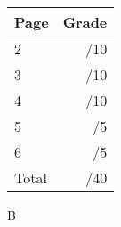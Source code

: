 \documentclass[12pt]{article}
\newcommand{\skipline}{\vspace{12pt}}
\begin{document}
\begin{table}[hbt]
\begin{center}
\begin{tabular}{|l|r|} \hline
Page&Grade\\
\hline \hline
\cline{1-2} 2 & \enspace\enspace\enspace\enspace\enspace\enspace/10\\
\cline{1-2} 3 & \enspace\enspace\enspace\enspace\enspace\enspace/10\\
\cline{1-2} 4 & \enspace\enspace\enspace\enspace\enspace\enspace/10\\
\cline{1-2} 5 & \enspace\enspace\enspace\enspace\enspace\enspace/5\\
\cline{1-2} 6 & \enspace\enspace\enspace\enspace\enspace\enspace/5\\
\cline{1-2} Total & \enspace\enspace\enspace\enspace\enspace\enspace/40\\
\hline
\end{tabular}

\skipline

\skipline

\skipline

B
\end{center}
\end{table}
\newpage
\end{document}
